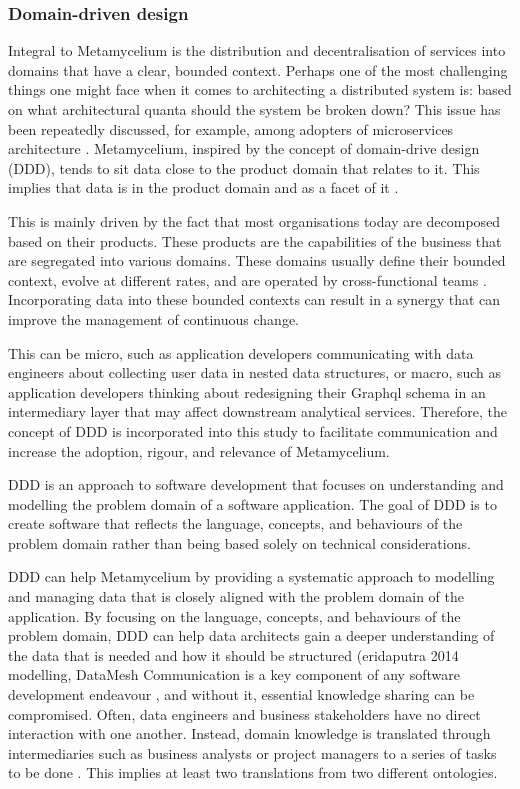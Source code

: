 \documentclass[preprint,12pt]{elsarticle}
\begin{document}
\subsubsection{Domain-driven design}


Integral to Metamycelium is the distribution and decentralisation of services into domains that have a clear, bounded context. Perhaps one of the most challenging things one might face when it comes to architecting a distributed system is: based on what architectural quanta should the system be broken down? This issue has been repeatedly discussed, for example, among adopters of microservices architecture \cite{DataMesh}. Metamycelium, inspired by the concept of domain-drive design (DDD), tends to sit data close to the product domain that relates to it. This implies that data is in the product domain and as a facet of it \cite{laigner2021data}.

This is mainly driven by the fact that most organisations today are decomposed based on their products. These products are the capabilities of the business that are segregated into various domains. These domains usually define their bounded context, evolve at different rates, and are operated by cross-functional teams \cite{teamtopologiesSkelton}. Incorporating data into these bounded contexts can result in a synergy that can improve the management of continuous change.

This can be micro, such as application developers communicating with data engineers about collecting user data in nested data structures, or macro, such as application developers thinking about redesigning their Graphql schema in an intermediary layer that may affect downstream analytical services. Therefore, the concept of DDD is incorporated into this study to facilitate communication and increase the adoption, rigour, and relevance of Metamycelium.

DDD is an approach to software development that focuses on understanding and modelling the problem domain of a software application. The goal of DDD is to create software that reflects the language, concepts, and behaviours of the problem domain rather than being based solely on technical considerations. 

DDD can help Metamycelium by providing a systematic approach to modelling and managing data that is closely aligned with the problem domain of the application. By focusing on the language, concepts, and behaviours of the problem domain, DDD can help data architects gain a deeper understanding of the data that is needed and how it should be structured (eridaputra 2014 modelling, DataMesh Communication is a key component of any software development endeavour \cite{sudhakar2012model}, and without it, essential knowledge sharing can be compromised. Often, data engineers and business stakeholders have no direct interaction with one another. Instead, domain knowledge is translated through intermediaries such as business analysts or project managers to a series of tasks to be done \cite{khrononov2021learning}. This implies at least two translations from two different ontologies.
\end{document}
